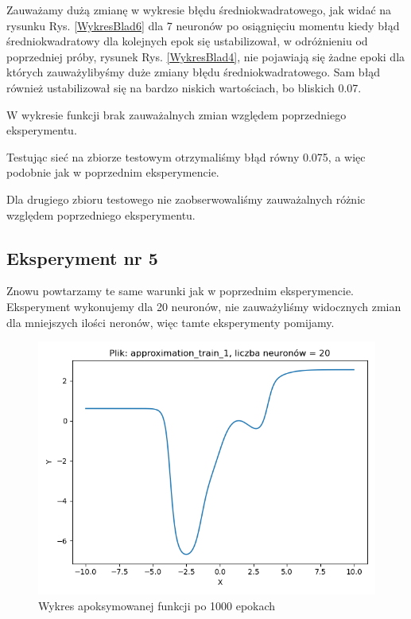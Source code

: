 \documentclass[12pt]{article}
\begin{document}
\newpage

Zauważamy dużą zmianę w wykresie błędu średniokwadratowego, jak widać na rysunku Rys. \ref{WykresBlad6} dla 7 neuronów po osiągnięciu momentu kiedy błąd średniokwadratowy dla kolejnych epok się ustabilizował, w odróżnieniu od poprzedniej próby, rysunek Rys. \ref{WykresBlad4}, nie pojawiają się żadne epoki dla których zauważylibyśmy duże zmiany błędu średniokwadratowego. Sam błąd również ustabilizował się na bardzo niskich wartościach, bo bliskich 0.07. 

W wykresie funkcji brak zauważalnych zmian względem poprzedniego eksperymentu.

Testując sieć na zbiorze testowym otrzymaliśmy błąd równy 0.075, a więc podobnie jak w poprzednim eksperymencie.

Dla drugiego zbioru testowego nie zaobserwowaliśmy zauważalnych różnic względem poprzedniego eksperymentu.

\newpage

\subsection{Eksperyment nr 5}
Znowu powtarzamy te same warunki jak w poprzednim eksperymencie.
Eksperyment wykonujemy dla 20 neuronów, nie zauważyliśmy widocznych zmian dla mniejszych ilości neronów, więc tamte eksperymenty pomijamy.


\begin{figure}[!htb]
 \centering
 \includegraphics[width=12cm]{FunctionPlot20Neuron.png}
 \caption{Wykres apoksymowanej funkcji po 1000 epokach}
 \vspace{-0.3cm}
 \label{WykresFun7}
\end{figure}
\end{document}

